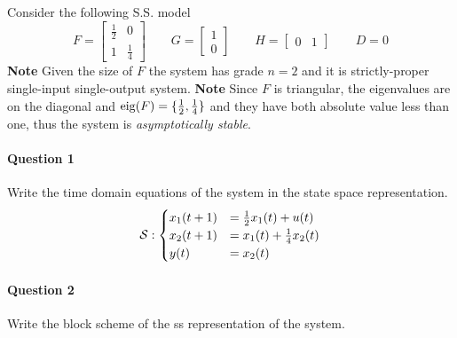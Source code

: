 
\begin{example}
    Consider the following S.S. model
    \[
    F = \begin{bmatrix}
        \frac{1}{2} & 0 \\
        1   & \frac{1}{4}
    \end{bmatrix}
    \qquad
    G = \begin{bmatrix}
        1 \\ 0
    \end{bmatrix}
    \qquad
    H = \begin{bmatrix}
        0 & 1
    \end{bmatrix}
    \qquad
    D = 0
    \]
    \textbf{Note} Given the size of $F$ the system has grade $n=2$ and it is strictly-proper single-input single-output system.
    \textbf{Note} Since $F$ is triangular, the eigenvalues are on the diagonal and $\operatorname*{eig} (F) = \{\frac{1}{2}, \frac{1}{4}\}$ and they have both absolute value less than one, thus the system is \emph{asymptotically stable}.

    \paragraph{Question 1} Write the time domain equations of the system in the state space representation.
    \[
        \mathcal{S}:
        \begin{cases}
            x_1(t+1) &= \frac{1}{2}x_1(t) + u(t) \\
            x_2(t+1) &= x_1(t) + \frac{1}{4}x_2(t) \\
            y(t) &= x_2(t)
        \end{cases}
    \]

    \paragraph{Question 2} Write the block scheme of the \gls{ss} representation of the system.
    \begin{figure}[H]
        \centering
\end{figure}
\end{example}
